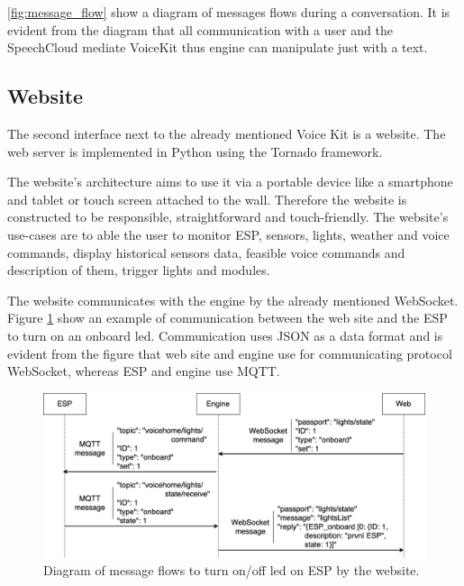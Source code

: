 \cref{fig:message_flow} show a diagram of messages flows during a conversation. It is evident from the diagram that all communication with a user and the SpeechCloud mediate VoiceKit thus engine can manipulate just with a text.

\subsection{Website}

The second interface next to the already mentioned Voice Kit is a website. The web server is implemented in Python using the Tornado framework.

The website's architecture aims to use it via a portable device like a smartphone and tablet or touch screen attached to the wall. Therefore the website is constructed to be responsible, straightforward and touch-friendly. The website's use-cases are to able the user to monitor ESP, sensors, lights, weather and voice commands, display historical sensors data, feasible voice commands and description of them, trigger lights and modules.

The website communicates with the engine by the already mentioned WebSocket. Figure \ref{fig:lights_onoff_messages} show an example of communication between the web site and the ESP to turn on an onboard led. Communication uses JSON as a data format and is evident from the figure that web site and engine use for communicating protocol WebSocket, whereas ESP and engine use MQTT.

\begin{figure}[H]
	\centering
	\includegraphics[width=\textwidth]{img/lights_onoff_messages.png}
	\caption{Diagram of message flows to turn on/off led on ESP by the website.}
	\label{fig:lights_onoff_messages}
\end{figure}
